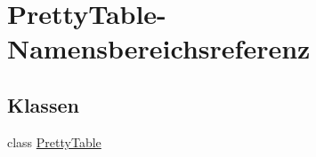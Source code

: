 \hypertarget{namespace_pretty_table}{}\section{Pretty\+Table-\/\+Namensbereichsreferenz}
\label{namespace_pretty_table}
\subsection*{Klassen}
\begin{DoxyCompactItemize}
\item 
class \mbox{\hyperlink{class_pretty_table_1_1_pretty_table}{Pretty\+Table}}
\end{DoxyCompactItemize}
